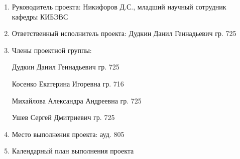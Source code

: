 \begin{enumerate}
\item Руководитель проекта:  Никифоров Д.С., младший научный сотрудник кафедры КИБЭВС\par
\item Ответственный исполнитель проекта: Дудкин Данил Геннадьевич гр. 725\par
\item Члены проектной группы:\par
\hspace{2cm}Дудкин Данил Геннадьевич гр. 725\par
\hspace{2cm}Косенко Екатерина Игоревна гр. 716\par
\hspace{2cm}Михайлова Александра Андреевна гр. 725\par
\hspace{2cm}Ушев Сергей Дмитриевич гр. 725\par
\item Место выполнения проекта: ауд. 805\par
\item Календарный план выполнения проекта\par
\end{enumerate}
	
\vspace{\baselineskip}

